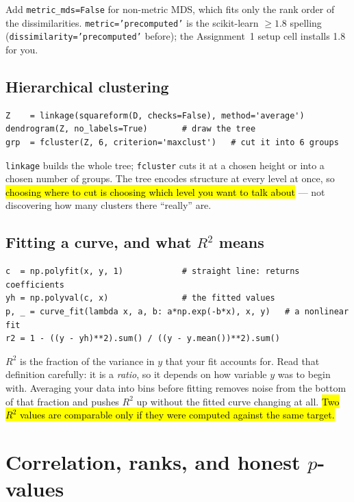 \documentclass[11pt]{article}
\begin{document}
Add \texttt{metric\_mds=False} for non-metric MDS, which fits only the rank
order of the dissimilarities. \texttt{metric='precomputed'} is the scikit-learn
$\geq 1.8$ spelling (\texttt{dissimilarity='precomputed'} before); the
Assignment~1 setup cell installs 1.8 for you.

\subsection{Hierarchical clustering}

\begin{lstlisting}
Z    = linkage(squareform(D, checks=False), method='average')
dendrogram(Z, no_labels=True)       # draw the tree
grp  = fcluster(Z, 6, criterion='maxclust')   # cut it into 6 groups
\end{lstlisting}

\texttt{linkage} builds the whole tree; \texttt{fcluster} cuts it at a chosen
height or into a chosen number of groups. The tree encodes structure at every
level at once, so \hl{choosing where to cut is choosing which level you want to
talk about} --- not discovering how many clusters there ``really'' are.

\subsection{Fitting a curve, and what \texorpdfstring{$R^2$}{R2} means}

\begin{lstlisting}
c  = np.polyfit(x, y, 1)            # straight line: returns coefficients
yh = np.polyval(c, x)               # the fitted values
p, _ = curve_fit(lambda x, a, b: a*np.exp(-b*x), x, y)   # a nonlinear fit
r2 = 1 - ((y - yh)**2).sum() / ((y - y.mean())**2).sum()
\end{lstlisting}

$R^2$ is the fraction of the variance in $y$ that your fit accounts for. Read
that definition carefully: it is a \emph{ratio}, so it depends on how variable
$y$ was to begin with. Averaging your data into bins before fitting removes
noise from the bottom of that fraction and pushes $R^2$ up without the fitted
curve changing at all. \hl{Two $R^2$ values are comparable only if they were
computed against the same target.}

\section{Correlation, ranks, and honest \texorpdfstring{$p$}{p}-values}
\end{document}
